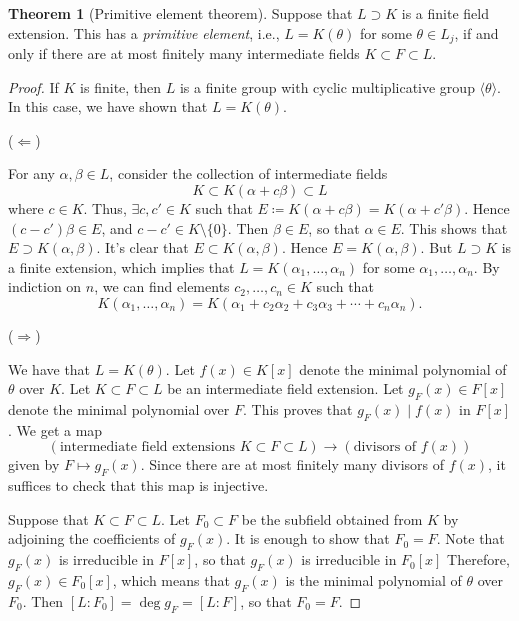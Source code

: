 \documentclass[10pt,letterpaper,cm]{nupset}
\theoremstyle{definition}
\theoremstyle{theorem}
\newtheorem{theorem}[definition]{Theorem}
\theoremstyle{remark}
\newcommand{\1}{\mathbf{1}}
\newcommand{\0}{\vec 0}
\begin{document}
\begin{theorem}[Primitive element theorem]
Suppose that $L \supset K$ is a finite field extension. This has a \textit{primitive element}, i.e.,  $L= K(\theta)$ for some $\theta \in L_j$, if and only if there are at most finitely many intermediate fields $K \subset F \subset L$.
\end{theorem}
\begin{proof}
If $K$ is finite, then $L$ is a finite group with cyclic multiplicative group $\langle \theta \rangle$. In this case, we have shown  that $L = K(\theta)$.

\medskip


($\Longleftarrow$) 

For any $\alpha, \beta \in L$, consider the collection of intermediate fields $$K \subset K(\alpha + c\beta) \subset L$$ where $c\in K$. Thus,  $ \exists c, c' \in K$ such that $E\coloneqq  K(\alpha + c \beta) = K(\alpha + c' \beta)$. Hence $(c - c')\beta \in E$, and $c- c' \in K \setminus \{0\}$. Then $ \beta \in E$, so that $\alpha \in E$. This shows that $E \supset K(\alpha, \beta)$. It's clear that $E \subset K(\alpha, \beta)$. Hence $E = K(\alpha, \beta)$. But $L \supset K$ is a finite extension, which implies that $L = K(\alpha_1, \ldots, \alpha_n)$ for some $\alpha_1, \ldots, \alpha_n$. By indiction on $n$, we can find elements $c_2, \ldots, c_n \in K$ such that $$ K(\alpha_1, \ldots, \alpha_n) = K(\alpha_1 + c_2\alpha_2 + c_3\alpha_3 + \cdots + c_n \alpha_n ) . $$

\medskip


($\Longrightarrow$) 

We have that $L= K(\theta)$. Let $f(x) \in K[x]$ denote the minimal polynomial of $\theta$ over $K$. Let $K \subset F \subset L$ be an intermediate field extension. Let $g_F(x) \in F[x]$ denote the minimal polynomial over $F$. This proves that $g_F(x) \mid f(x)$ in $F[x]$. We get a map $$\left(\text{intermediate field extensions } K \subset F \subset L \right) \to \left(\text{divisors of } f(x)\right)$$ given by $F \mapsto g_F(x)$. Since there are at most finitely many divisors of $f(x)$, it suffices to check that this map is injective. 

\medskip

 Suppose that $K \subset F \subset L$. Let $F_0 \subset F$ be the subfield obtained from $K$ by adjoining the coefficients of $g_F(x)$. It is enough to show that $F_0 = F$. Note that $g_F(x)$ is irreducible in $F[x]$, so that $g_F(x)$ is irreducible in $F_0[x]$ Therefore, $g_F(x) \in F_0[x]$, which means that $g_F(x)$ is the minimal polynomial of $\theta$ over $F_0$. Then $[L: F_0] = \deg{g_F} = [L: F]$, so that $F_0 = F$. 
\end{proof}
\end{document}
